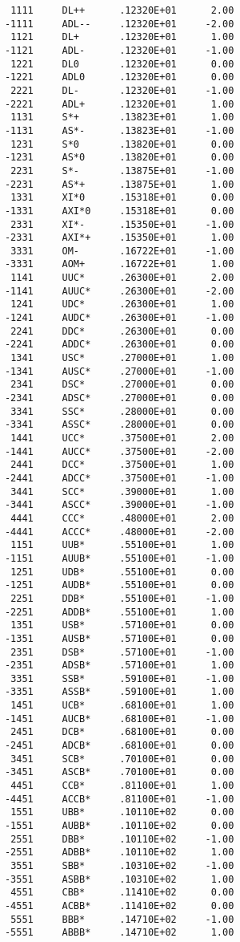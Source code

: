 \begin{verbatim}
       1111     DL++      .12320E+01      2.00
      -1111     ADL--     .12320E+01     -2.00
       1121     DL+       .12320E+01      1.00
      -1121     ADL-      .12320E+01     -1.00
       1221     DL0       .12320E+01      0.00
      -1221     ADL0      .12320E+01      0.00
       2221     DL-       .12320E+01     -1.00
      -2221     ADL+      .12320E+01      1.00
       1131     S*+       .13823E+01      1.00
      -1131     AS*-      .13823E+01     -1.00
       1231     S*0       .13820E+01      0.00
      -1231     AS*0      .13820E+01      0.00
       2231     S*-       .13875E+01     -1.00
      -2231     AS*+      .13875E+01      1.00
       1331     XI*0      .15318E+01      0.00
      -1331     AXI*0     .15318E+01      0.00
       2331     XI*-      .15350E+01     -1.00
      -2331     AXI*+     .15350E+01      1.00
       3331     OM-       .16722E+01     -1.00
      -3331     AOM+      .16722E+01      1.00
       1141     UUC*      .26300E+01      2.00
      -1141     AUUC*     .26300E+01     -2.00
       1241     UDC*      .26300E+01      1.00
      -1241     AUDC*     .26300E+01     -1.00
       2241     DDC*      .26300E+01      0.00
      -2241     ADDC*     .26300E+01      0.00
       1341     USC*      .27000E+01      1.00
      -1341     AUSC*     .27000E+01     -1.00
       2341     DSC*      .27000E+01      0.00
      -2341     ADSC*     .27000E+01      0.00
       3341     SSC*      .28000E+01      0.00
      -3341     ASSC*     .28000E+01      0.00
       1441     UCC*      .37500E+01      2.00
      -1441     AUCC*     .37500E+01     -2.00
       2441     DCC*      .37500E+01      1.00
      -2441     ADCC*     .37500E+01     -1.00
       3441     SCC*      .39000E+01      1.00
      -3441     ASCC*     .39000E+01     -1.00
       4441     CCC*      .48000E+01      2.00
      -4441     ACCC*     .48000E+01     -2.00
       1151     UUB*      .55100E+01      1.00
      -1151     AUUB*     .55100E+01     -1.00
       1251     UDB*      .55100E+01      0.00
      -1251     AUDB*     .55100E+01      0.00
       2251     DDB*      .55100E+01     -1.00
      -2251     ADDB*     .55100E+01      1.00
       1351     USB*      .57100E+01      0.00
      -1351     AUSB*     .57100E+01      0.00
       2351     DSB*      .57100E+01     -1.00
      -2351     ADSB*     .57100E+01      1.00
       3351     SSB*      .59100E+01     -1.00
      -3351     ASSB*     .59100E+01      1.00
       1451     UCB*      .68100E+01      1.00
      -1451     AUCB*     .68100E+01     -1.00
       2451     DCB*      .68100E+01      0.00
      -2451     ADCB*     .68100E+01      0.00
       3451     SCB*      .70100E+01      0.00
      -3451     ASCB*     .70100E+01      0.00
       4451     CCB*      .81100E+01      1.00
      -4451     ACCB*     .81100E+01     -1.00
       1551     UBB*      .10110E+02      0.00
      -1551     AUBB*     .10110E+02      0.00
       2551     DBB*      .10110E+02     -1.00
      -2551     ADBB*     .10110E+02      1.00
       3551     SBB*      .10310E+02     -1.00
      -3551     ASBB*     .10310E+02      1.00
       4551     CBB*      .11410E+02      0.00
      -4551     ACBB*     .11410E+02      0.00
       5551     BBB*      .14710E+02     -1.00
      -5551     ABBB*     .14710E+02      1.00
            

\end{verbatim}
